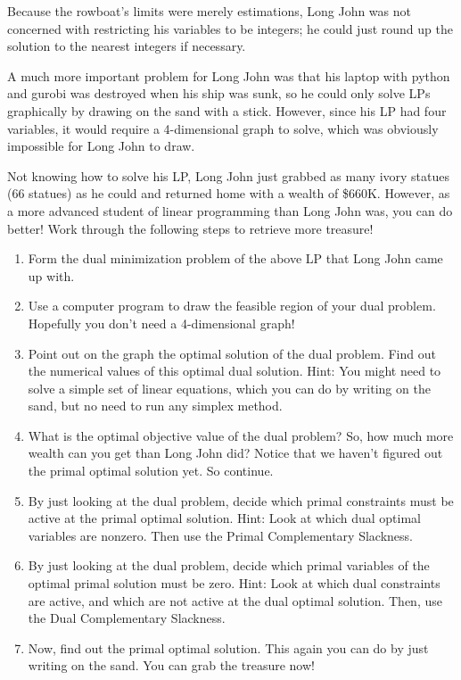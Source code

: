 \documentclass[11pt]{article}
\begin{document}
\begin{enumerate}
Because the rowboat's limits were merely estimations, Long John was not concerned with restricting his variables to be integers; he could just round up the solution to the nearest integers if necessary. 

A much more important problem for Long John was that his laptop with python and gurobi was destroyed when his ship was sunk, so he could only solve LPs graphically by drawing on the sand with a stick. However, since his LP had four variables, it would require a 4-dimensional graph to solve, which was obviously impossible for Long John to draw.

Not knowing how to solve his LP, Long John just grabbed as many ivory statues (66 statues) as he could and returned home with a wealth of \$660K. However, as a more advanced student of linear programming than Long John was, you can do better! Work through the following steps to retrieve more treasure!

\begin{enumerate}
\item Form the dual minimization problem of the above LP that Long John came up with. 
\item Use a computer program to draw the feasible region of your dual problem. Hopefully you don't need a 4-dimensional graph!
\item Point out on the graph the optimal solution of the dual problem. Find out the numerical values of this optimal dual solution. Hint: You might need to solve a simple set of linear equations, which you can do by writing on the sand, but no need to run any simplex method. 
\item What is the optimal objective value of the dual problem? So, how much more wealth can you get than Long John did? Notice that we haven't figured out the primal optimal solution yet. So continue.
\item By just looking at the dual problem, decide which primal constraints must be active at the primal optimal solution. Hint: Look at which dual optimal variables are nonzero. Then use the Primal Complementary Slackness.
\item By just looking at the dual problem, decide which primal variables of the optimal primal solution
 must be zero. Hint: Look at which dual constraints are active, and which are not active at the dual optimal solution. Then, use the Dual Complementary Slackness.
\item Now, find out the primal optimal solution. This again you can do by just writing on the sand. You can grab the treasure now!
\end{enumerate}


\end{enumerate}
\end{document}
